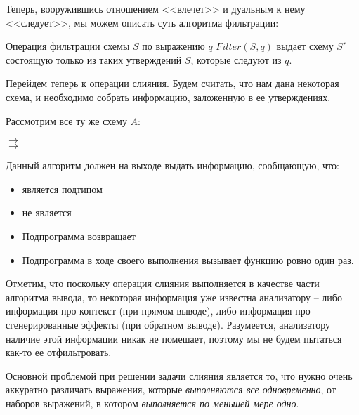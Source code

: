 Теперь, вооружившись отношением <<влечет>> и дуальным к нему <<следует>>, мы можем описать суть алгоритма фильтрации:

\begin{definition}
    Операция фильтрации схемы $S$ по выражению $q$ $Filter(S, q)$ выдает схему $S'$ состоящую только из таких утверждений $S$, которые следуют из $q$.
\end{definition}


\bigskip

Перейдем теперь к операции слияния. Будем считать, что нам дана некоторая схема, и необходимо собрать информацию, заложенную в ее утверждениях. 

Рассмотрим все ту же схему $A$:

{
     $\rightarrow$  \\
     $\rightarrow$  \\
}{}

Данный алгоритм должен на выходе выдать информацию, сообщающую, что:
    
\begin{itemize}
    \item {} является подтипом 
    \item {} не является 
    \item Подпрограмма  возвращает 
    \item Подпрограмма  в ходе своего выполнения вызывает функцию  ровно один раз.
\end{itemize}
    
Отметим, что поскольку операция слияния выполняется в качестве части алгоритма вывода, то некоторая информация уже известна анализатору -- либо информация про контекст (при прямом выводе), либо информация про сгенерированные эффекты (при обратном выводе). Разумеется, анализатору наличие этой информации никак не помешает, поэтому мы не будем пытаться как-то ее отфильтровать.

Основной проблемой при решении задачи слияния является то, что нужно очень аккуратно различать выражения, которые \emph{выполняются все одновременно}, от наборов выражений, в котором \emph{выполняется по меньшей мере одно}. 